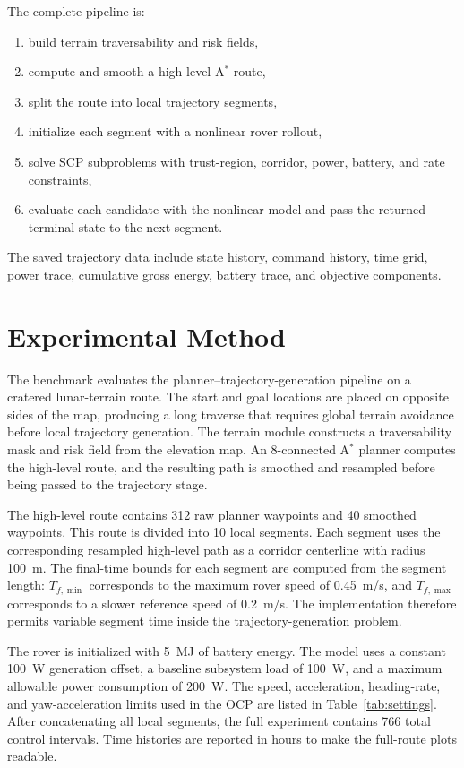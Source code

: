 The complete pipeline is:
\begin{enumerate}
    \item build terrain traversability and risk fields,
    \item compute and smooth a high-level A$^\ast$ route,
    \item split the route into local trajectory segments,
    \item initialize each segment with a nonlinear rover rollout,
    \item solve SCP subproblems with trust-region, corridor, power, battery, and rate constraints,
    \item evaluate each candidate with the nonlinear model and pass the returned terminal state to the next segment.
\end{enumerate}
The saved trajectory data include state history, command history, time grid, power trace, cumulative gross energy, battery trace, and objective components.

\section{Experimental Method}
The benchmark evaluates the planner--trajectory-generation pipeline on a cratered lunar-terrain route. The start and goal locations are placed on opposite sides of the map, producing a long traverse that requires global terrain avoidance before local trajectory generation. The terrain module constructs a traversability mask and risk field from the elevation map. An 8-connected A$^\ast$ planner computes the high-level route, and the resulting path is smoothed and resampled before being passed to the trajectory stage.

The high-level route contains 312 raw planner waypoints and 40 smoothed waypoints. This route is divided into 10 local segments. Each segment uses the corresponding resampled high-level path as a corridor centerline with radius \SI{100}{m}. The final-time bounds for each segment are computed from the segment length: $T_{f,\min}$ corresponds to the maximum rover speed of \SI{0.45}{m/s}, and $T_{f,\max}$ corresponds to a slower reference speed of \SI{0.2}{m/s}. The implementation therefore permits variable segment time inside the trajectory-generation problem.

The rover is initialized with \SI{5}{MJ} of battery energy. The model uses a constant \SI{100}{W} generation offset, a baseline subsystem load of \SI{100}{W}, and a maximum allowable power consumption of \SI{200}{W}. The speed, acceleration, heading-rate, and yaw-acceleration limits used in the OCP are listed in Table~\ref{tab:settings}. After concatenating all local segments, the full experiment contains 766 total control intervals. Time histories are reported in hours to make the full-route plots readable.


